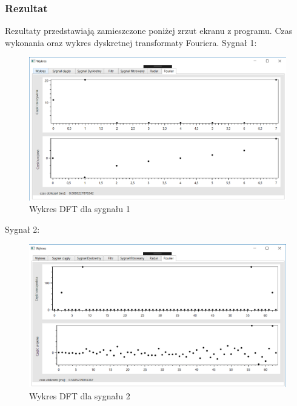 \documentclass[12pt]{article}
\begin{document}
\subsubsection{Rezultat}

Rezultaty przedstawiają zamieszczone poniżej zrzut ekranu z programu. Czas wykonania oraz wykres dyskretnej transformaty Fouriera.
\newpage
 Sygnał 1:
\begin{figure}[h!]
 \centering
 \includegraphics[width=12.3cm]{s13F.PNG}
 \vspace{-0.3cm}
 \caption{Wykres DFT dla sygnału 1}
 \label{Wykres dla wynikw eksperymentu pierwszego}
\end{figure}

Sygnał 2:
\begin{figure}[h!]
 \centering
 \includegraphics[width=12.3cm]{s16F.PNG}
 \vspace{-0.3cm}
 \caption{Wykres DFT dla sygnału 2}
 \label{Wykres dla wynikw eksperymentu pierwszego}
\end{figure}
\end{document}
